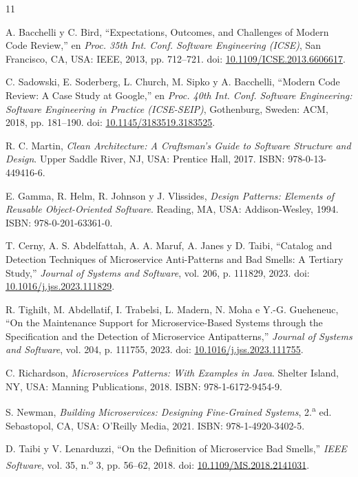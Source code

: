 \documentclass[10pt,a4paper]{article}
\begin{document}
\begin{thebibliography}{11}

A. Bacchelli y C. Bird, ``Expectations, Outcomes, and Challenges of Modern Code Review,''
en \emph{Proc. 35th Int. Conf. Software Engineering (ICSE)}, San Francisco, CA, USA: IEEE,
2013, pp. 712--721. doi: \href{https://doi.org/10.1109/ICSE.2013.6606617}{10.1109/ICSE.2013.6606617}.

C. Sadowski, E. Soderberg, L. Church, M. Sipko y A. Bacchelli, ``Modern Code Review: A Case
Study at Google,'' en \emph{Proc. 40th Int. Conf. Software Engineering: Software Engineering
in Practice (ICSE-SEIP)}, Gothenburg, Sweden: ACM, 2018, pp. 181--190.
doi: \href{https://doi.org/10.1145/3183519.3183525}{10.1145/3183519.3183525}.

R. C. Martin, \emph{Clean Architecture: A Craftsman's Guide to Software Structure and
Design}. Upper Saddle River, NJ, USA: Prentice Hall, 2017. ISBN: 978-0-13-449416-6.

E. Gamma, R. Helm, R. Johnson y J. Vlissides, \emph{Design Patterns: Elements of Reusable
Object-Oriented Software}. Reading, MA, USA: Addison-Wesley, 1994. ISBN: 978-0-201-63361-0.

T. Cerny, A. S. Abdelfattah, A. A. Maruf, A. Janes y D. Taibi, ``Catalog and Detection
Techniques of Microservice Anti-Patterns and Bad Smells: A Tertiary Study,'' \emph{Journal
of Systems and Software}, vol. 206, p. 111829, 2023.
doi: \href{https://doi.org/10.1016/j.jss.2023.111829}{10.1016/j.jss.2023.111829}.

R. Tighilt, M. Abdellatif, I. Trabelsi, L. Madern, N. Moha e Y.-G. Gueheneuc, ``On the
Maintenance Support for Microservice-Based Systems through the Specification and the
Detection of Microservice Antipatterns,'' \emph{Journal of Systems and Software}, vol. 204,
p. 111755, 2023.
doi: \href{https://doi.org/10.1016/j.jss.2023.111755}{10.1016/j.jss.2023.111755}.

C. Richardson, \emph{Microservices Patterns: With Examples in Java}. Shelter Island, NY,
USA: Manning Publications, 2018. ISBN: 978-1-6172-9454-9.

S. Newman, \emph{Building Microservices: Designing Fine-Grained Systems}, 2.\textsuperscript{a}
ed. Sebastopol, CA, USA: O'Reilly Media, 2021. ISBN: 978-1-4920-3402-5.

D. Taibi y V. Lenarduzzi, ``On the Definition of Microservice Bad Smells,'' \emph{IEEE
Software}, vol. 35, n.\textsuperscript{o} 3, pp. 56--62, 2018.
doi: \href{https://doi.org/10.1109/MS.2018.2141031}{10.1109/MS.2018.2141031}.


\end{thebibliography}
\end{document}

